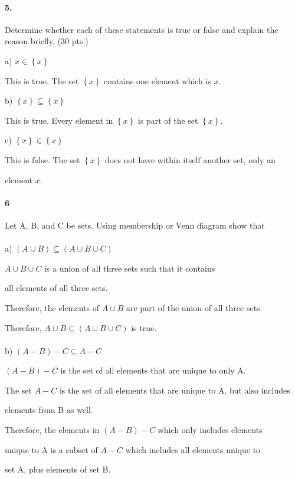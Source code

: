 \documentclass{article} %
\begin{document}
    \newpage

    \paragraph*{5.}
    Determine whether each of these statements is true or false and explain the reason briefly. (30 pts.)

    a) $x \in \left\lbrace x \right\rbrace$

    This is true. The set $\left\lbrace x \right\rbrace$ contains one element which is $x$.

    b) $\left\lbrace x \right\rbrace \subseteq \left\lbrace x \right\rbrace$

    This is true. Every element in $\left\lbrace x \right\rbrace$ is part of the set $\left\lbrace x \right\rbrace$. 
    
    c) $\left\lbrace x \right\rbrace \in \left\lbrace x \right\rbrace$
    
    This is false. The set $\left\lbrace x \right\rbrace$ does not have within itself another set, only an 
    
    element $x$.

    \newpage

    \paragraph*{6}  Let A, B, and C be sets. Using membership or Venn diagram show that
    \\\\
    a) $(A \cup B) \subseteq (A \cup B \cup C)$

    $A \cup B \cup C$ is a union of all three sets such that it contains 
    
    all elements of all three sets. 

    Therefore, the elements of $A \cup B$ are part of the union of all three sets.

    Therefore, $A \cup B \subseteq (A \cup B \cup C)$ is true.
    \\\\
    b) $(A - B) - C \subseteq A-C$

    $(A-B) - C$ is the set of all elements that are unique to only A. 

    The set $A - C$ is the set of all elements that are unique to A, but also includes 
    
    elements from B as well. 

    Therefore, the elements in $(A - B) - C$ which only includes elements 
    
    unique to A is a subset of $A - C$ which includes all elements unique to 
    
    set A, plus elements of set B.


    
\end{document}
